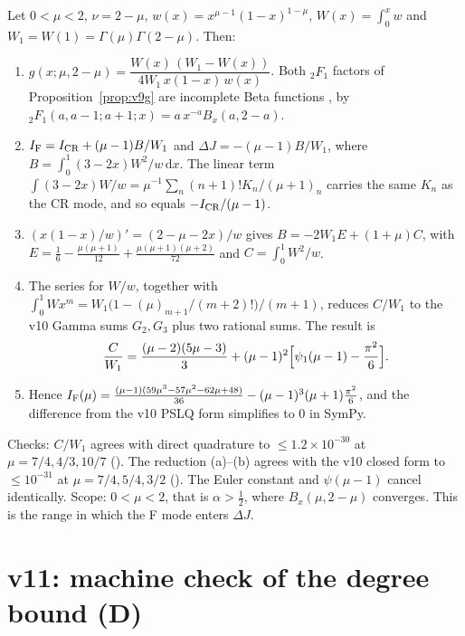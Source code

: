 \begin{theorem}
\label{thm:v11IF}
Let \(0<\mu<2\), \(\nu=2-\mu\), \(w(x)=x^{\mu-1}(1-x)^{1-\mu}\),
\(W(x)=\int_0^xw\) and \(W_1=W(1)=\Gamma(\mu)\Gamma(2-\mu)\). Then:
\begin{enumerate}[label=(\alph*)]
\item \(g(x;\mu,2-\mu)=\dfrac{W(x)\,(W_1-W(x))}{4W_1\,x(1-x)\,w(x)}\).
Both \({}_2F_1\) factors of Proposition~\ref{prop:v9g} are
incomplete Beta functions \cite{DLMFBeta}, by
\({}_2F_1(a,a-1;a+1;x)=a\,x^{-a}B_x(a,2-a)\).
\item \(I_{\rm F}=I_{\rm CR}+(\mu-1)B/W_1\) and
\(\Delta J=-(\mu-1)B/W_1\), where
\(B=\int_0^1(3-2x)W^2/w\,\mathrm dx\). The linear term
\(\int(3-2x)W/w=\mu^{-1}\sum_n(n+1)!K_n/(\mu+1)_n\) carries the same
\(K_n\) as the CR mode, and so equals \(-I_{\rm CR}/(\mu-1)\).
\item \((x(1-x)/w)'=(2-\mu-2x)/w\) gives
\(B=-2W_1E+(1+\mu)C\), with
\(E=\tfrac16-\tfrac{\mu(\mu+1)}{12}+\tfrac{\mu(\mu+1)(\mu+2)}{72}\)
and \(C=\int_0^1W^2/w\).
\item The series for \(W/w\), together with
\(\int_0^1Wx^m=W_1\bigl(1-(\mu)_{m+1}/(m+2)!\bigr)/(m+1)\), reduces
\(C/W_1\) to the v10 Gamma sums \(G_2,G_3\) plus two rational sums.
The result is
\[
\frac{C}{W_1}=\frac{(\mu-2)(5\mu-3)}3+(\mu-1)^2\Bigl[\psi_1(\mu-1)-\frac{\pi^2}6\Bigr].
\]
\item Hence
\(I_{\rm F}(\mu)=\tfrac{(\mu-1)(59\mu^3-57\mu^2-62\mu+48)}{36}-(\mu-1)^3(\mu+1)\tfrac{\pi^2}6\),
and the difference from the v10 PSLQ form simplifies to \(0\) in
SymPy.
\end{enumerate}
\end{theorem}
Checks: \(C/W_1\) agrees with direct quadrature to
\(\le1.2\times10^{-30}\) at \(\mu=7/4,4/3,10/7\)
(). The reduction (a)--(b) agrees
with the v10 closed form to \(\le10^{-31}\) at \(\mu=7/4,5/4,3/2\)
(). The Euler constant and
\(\psi(\mu-1)\) cancel identically. Scope: \(0<\mu<2\), that is
\(\alpha>\tfrac12\), where \(B_x(\mu,2-\mu)\) converges. This is the
range in which the F mode enters \(\Delta J\).

\section{v11: machine check of the degree bound (D)}
\label{sec:v11D}

